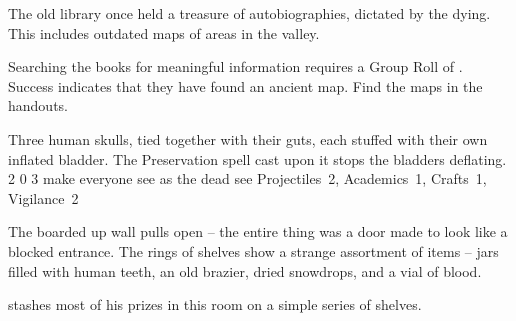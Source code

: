 \begin{exampletext}
  The old library once held a treasure of autobiographies, dictated by the dying.
  This includes outdated maps of areas in the \gls{valley}.
\end{exampletext}

Searching the books for meaningful information requires a Group Roll of .
Success indicates that they have found an ancient map.
Find the maps in the handouts.

  {Three human skulls, tied together with their guts, each stuffed with their own inflated bladder.
  The Preservation spell cast upon it stops the bladders deflating.}%
  {2}%
  {0}%
  {3}%
  {make everyone see as the dead see}%
  {
    \setcounter{Fate}{2}
    \setcounter{Air}{2}
    \setcounter{Water}{1}
  }%
  {Projectiles~2, Academics~1, Crafts~1, Vigilance~2}%
  {
    \revelationSpell
  }%

\begin{boxtext}

  The boarded up wall pulls open -- the entire thing was a door made to look like a blocked entrance.  The rings of shelves show a strange assortment of items -- jars filled with human teeth, an old brazier, dried snowdrops, and a vial of blood.

\end{boxtext}


 stashes most of his prizes in this room on a simple series of shelves.

